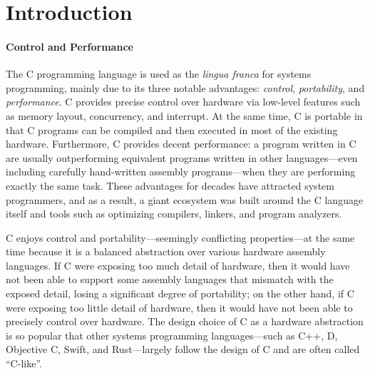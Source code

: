 \section{Introduction}
\label{sec:introduction}


\paragraph{Control and Performance}

The C programming language is used as the \emph{lingua franca} for systems programming, mainly due
to its three notable advantages: \emph{control}, \emph{portability}, and \emph{performance}.  C
provides precise control over hardware via low-level features such as memory layout, concurrency,
and interrupt.  At the same time, C is portable in that C programs can be compiled and then executed
in most of the existing hardware.  Furthermore, C provides decent performance: a program written in
C are usually outperforming equivalent programs written in other languages---even including
carefully hand-written assembly programs---when they are performing exactly the same task.  These
advantages for decades have attracted system programmers, and as a result, a giant ecosystem was
built around the C language itself and tools such as optimizing compilers, linkers, and program
analyzers.

C enjoys control and portability---seemingly conflicting properties---at the same time because it is
a balanced abstraction over various hardware assembly languages.  If C were exposing too much detail
of hardware, then it would have not been able to support some assembly languages that mismatch with
the exposed detail, losing a significant degree of portability; on the other hand, if C were
exposing too little detail of hardware, then it would have not been able to precisely control over
hardware.  The design choice of C as a hardware abstraction is so popular that other systems
programming languages---such as C++, D, Objective C, Swift, and Rust---largely follow the design of
C and are often called ``C-like''.





